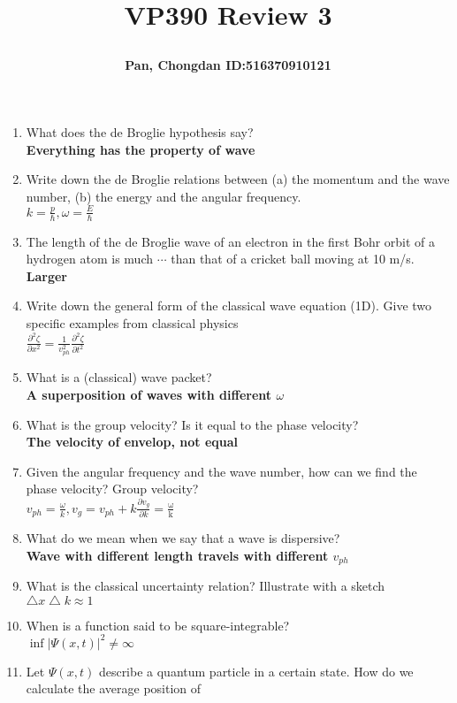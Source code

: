 \documentclass[a4paper]{article}
\title{\Large \textbf{VP390 Review 3}\\
\author{\textbf{Pan, Chongdan ID:516370910121}\\
}
}
\begin{document}
\maketitle
\begin{enumerate}
    \item What does the de Broglie hypothesis say?
    \\ \textbf{Everything has the property of wave}
    \item Write down the de Broglie relations between (a) the momentum and the wave number, (b) the energy and the angular frequency.
    \\ \textbf{$k=\frac{p}{\hbar},\omega=\frac{E}{\hbar}$}
    \item The length of the de Broglie wave of an electron in the first Bohr orbit of a hydrogen atom is much $\cdots$ than that of a cricket ball moving at 10 m/s.
    \\ \textbf{Larger}
    \item Write down the general form of the classical wave equation (1D). Give two specific examples from classical physics
    \\ \textbf{$\frac{\partial^2\zeta}{\partial x^2}=\frac{1}{v_{ph}^2}\frac{\partial^2\zeta}{\partial t^2}$}
    \item What is a (classical) wave packet?
    \\ \textbf{A superposition of waves with different $\omega$}
    \item What is the group velocity? Is it equal to the phase velocity?
    \\ \textbf{The velocity of envelop, not equal}
    \item Given the angular frequency and the wave number, how can we find the phase velocity? Group velocity?
    \\ \textbf{$v_{ph}=\frac{\omega}{k},v_g=v_{ph}+k\frac{\partial v_g}{\partial k}=\frac{\mathrm{\omega}}{\mathrm{k}}$}
    \item What do we mean when we say that a wave is dispersive?
    \\ \textbf{Wave with different length travels with different $v_{ph}$}
    \item What is the classical uncertainty relation? Illustrate with a sketch
    \\ \textbf{$\bigtriangleup x\bigtriangleup k\approx1 $}
    \item When is a function said to be square-integrable?
    \\ \textbf{$\inf|\Psi(x,t)|^2\neq\infty$}
    \item Let $\Psi(x,t)$ describe a quantum particle in a certain state. How do we calculate the average position of

\end{enumerate}
\end{document}
